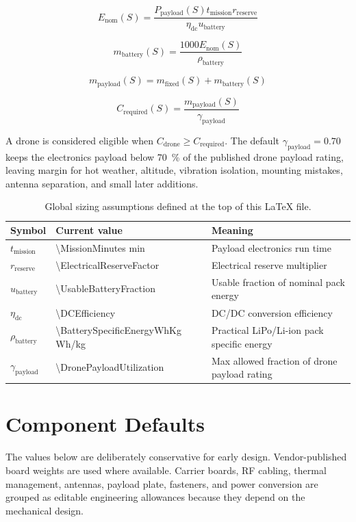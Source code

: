 \documentclass[11pt]{article}
\begin{document}
\[
  E_\mathrm{nom}(S)=
  \frac{P_\mathrm{payload}(S)t_\mathrm{mission}r_\mathrm{reserve}}
       {\eta_\mathrm{dc}u_\mathrm{battery}}
\]

\[
  m_\mathrm{battery}(S)=
  \frac{1000E_\mathrm{nom}(S)}{\rho_\mathrm{battery}}
\]

\[
  m_\mathrm{payload}(S)=m_\mathrm{fixed}(S)+m_\mathrm{battery}(S)
\]

\[
  C_\mathrm{required}(S)=
  \frac{m_\mathrm{payload}(S)}{\gamma_\mathrm{payload}}
\]

A drone is considered eligible when
$C_\mathrm{drone}\geq C_\mathrm{required}$. The default
$\gamma_\mathrm{payload}=0.70$ keeps the electronics payload below
\SI{70}{\percent} of the published drone payload rating, leaving margin for hot
weather, altitude, vibration isolation, mounting mistakes, antenna separation,
and small later additions.

\begin{table}[h]
\centering
\caption{Global sizing assumptions defined at the top of this \LaTeX{} file.}
\begin{tabular}{lll}
\toprule
Symbol & Current value & Meaning \\
\midrule
$t_\mathrm{mission}$ & \num{\MissionMinutes} min & Payload electronics run time \\
$r_\mathrm{reserve}$ & \num{\ElectricalReserveFactor} & Electrical reserve multiplier \\
$u_\mathrm{battery}$ & \num{\UsableBatteryFraction} & Usable fraction of nominal pack energy \\
$\eta_\mathrm{dc}$ & \num{\DCEfficiency} & DC/DC conversion efficiency \\
$\rho_\mathrm{battery}$ & \num{\BatterySpecificEnergyWhKg} Wh/kg & Practical LiPo/Li-ion pack specific energy \\
$\gamma_\mathrm{payload}$ & \num{\DronePayloadUtilization} & Max allowed fraction of drone payload rating \\
\bottomrule
\end{tabular}
\end{table}

\section*{Component Defaults}

The values below are deliberately conservative for early design. Vendor-published
board weights are used where available. Carrier boards, RF cabling, thermal
management, antennas, payload plate, fasteners, and power conversion are grouped
as editable engineering allowances because they depend on the mechanical design.
\end{document}

